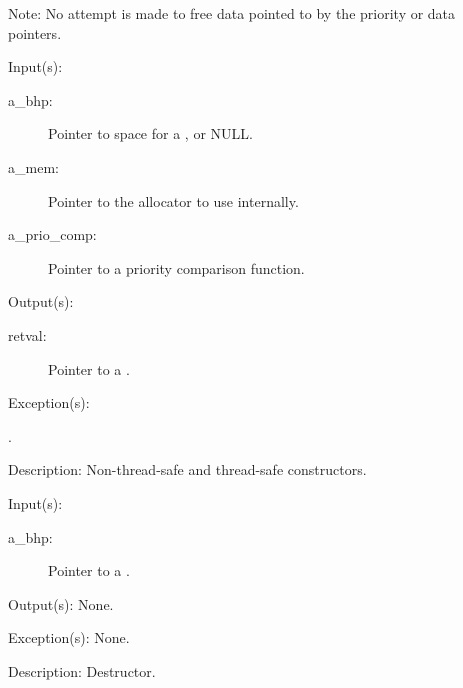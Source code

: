 \begin{capi}
\begin{capilist}
		Note: No attempt is made to free data pointed to by the priority
		or data pointers.
	\end{capilist}
\label{bhp_new}
\label{bhp_new_r}
	\begin{capilist}
	\item[Input(s): ]
		\begin{description}\item[]
		\item[a\_bhp: ]
			Pointer to space for a , or NULL.
		\item[a\_mem: ]
			Pointer to the allocator to use internally.
		\item[a\_prio\_comp: ]
			Pointer to a priority comparison function.
		\end{description}
	\item[Output(s): ]
		\begin{description}\item[]
		\item[retval: ]
			Pointer to a .
		\end{description}
	\item[Exception(s): ]
		\begin{description}\item[]
		\item[.]
		\end{description}
	\item[Description: ]
		Non-thread-safe and thread-safe constructors.
	\end{capilist}
\label{bhp_delete}
	\begin{capilist}
	\item[Input(s): ]
		\begin{description}\item[]
		\item[a\_bhp: ]
			Pointer to a \classname{bhp}.
		\end{description}
	\item[Output(s): ] None.
	\item[Exception(s): ] None.
	\item[Description: ]
		Destructor.
	\end{capilist}

\end{capi}
